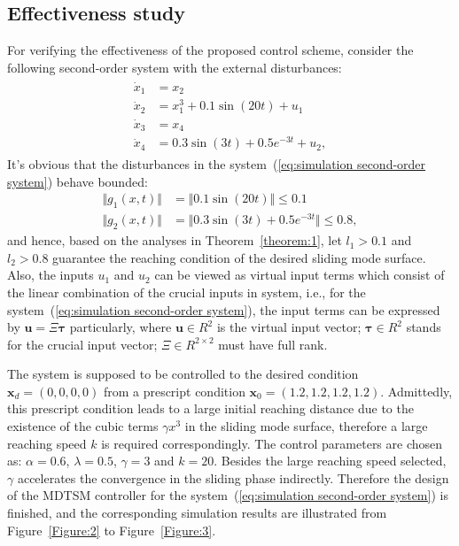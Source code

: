 \documentclass[3p]{elsarticle}
\theoremstyle{plain}
\theoremstyle{remark}
\begin{document}
\subsection{Effectiveness study}
For verifying the effectiveness of the proposed control scheme, consider the following second-order system with the external disturbances:
\begin{align}
\begin{split}
\dot x_1 &= x_2\\
\dot x_2 &= x_1^3+0.1\sin(20t)+u_1\\
\dot x_3 &= x_4\\
\dot x_4 &= 0.3\sin(3t)+0.5e^{-3t}+u_2,\label{eq:simulation second-order system}
\end{split}
\end{align}
It's obvious that the disturbances in the system~(\ref{eq:simulation second-order system}) behave bounded:
\begin{align*}
\Vert g_1(x,t)\Vert &= \Vert 0.1\sin(20t)\Vert\le 0.1\\
\Vert g_2(x,t)\Vert &= \Vert 0.3\sin(3t)+0.5e^{-3t}\Vert\le 0.8,
\end{align*}
and hence, based on the analyses in Theorem~\ref{theorem:1}, let $l_1>0.1$ and $l_2>0.8$ guarantee the reaching condition of the desired sliding mode  surface. Also, the inputs $u_1$ and $u_2$ can be viewed as virtual input terms which consist of the linear combination of the crucial inputs in system, i.e., for the system~(\ref{eq:simulation second-order system}), the input terms can be expressed by $\bm u = \Xi\bm\tau$ particularly, where $\bm u\in R^2$ is the virtual input vector; $\bm \tau\in R^2$ stands for the crucial input vector; $\Xi\in R^{2\times 2}$ must have full rank.\par
The system is supposed to be controlled to the desired condition $\bm x_d=(0,0,0,0)$ from a prescript condition $\bm x_0=(1.2,1.2,1.2,1.2)$. Admittedly, this prescript condition leads to a large initial reaching distance due to the existence of the cubic terms $\gamma x^3$ in the sliding mode  surface, therefore a large reaching speed $k$ is required correspondingly. The control parameters are chosen as: $\alpha = 0.6$, $\lambda = 0.5$, $\gamma = 3$ and $k = 20$. Besides the large reaching speed selected, $\gamma$ accelerates the convergence in the sliding phase indirectly. Therefore the design of the MDTSM controller for the system~(\ref{eq:simulation second-order system}) is finished, and the corresponding simulation results are illustrated from Figure~\ref{Figure:2} to Figure~\ref{Figure:3}.
\end{document}
